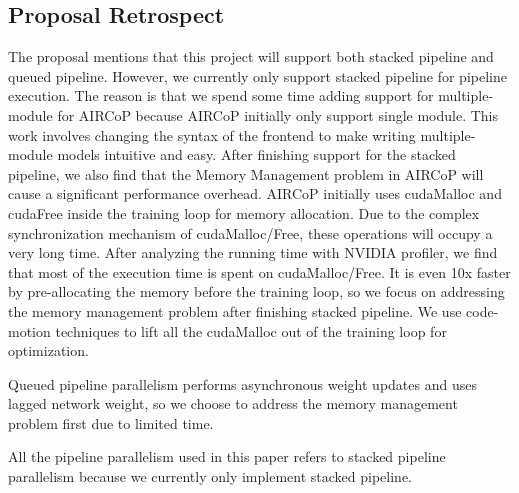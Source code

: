 \documentclass[sigplan, nonacm]{acmart}\settopmatter{printfolios=true,printccs=false,printacmref=false}
\begin{document}
\subsection{Proposal Retrospect}
The proposal mentions that this project will support both stacked pipeline and queued pipeline. However, we currently only support stacked pipeline for pipeline execution. The reason is that we spend some time adding support for multiple-module for AIRCoP because AIRCoP initially only support single module. This work involves changing the syntax of the frontend to make writing multiple-module models intuitive and easy. After finishing support for the stacked pipeline, we also find that the Memory Management problem in AIRCoP will cause a significant performance overhead. AIRCoP initially uses cudaMalloc and cudaFree inside the training loop for memory allocation. Due to the complex synchronization mechanism of cudaMalloc/Free, these operations will occupy a very long time. After analyzing the running time with NVIDIA profiler, we find that most of the execution time is spent on cudaMalloc/Free. It is even 10x faster by pre-allocating the memory before the training loop, so we focus on addressing the memory management problem after finishing stacked pipeline. We use code-motion techniques to lift all the cudaMalloc out of the training loop for optimization.\par
 Queued pipeline parallelism performs asynchronous weight updates and uses lagged network weight, so we choose to address the memory management problem first due to limited time.\par
All the pipeline parallelism used in this paper refers to stacked pipeline parallelism because we currently only implement stacked pipeline.
\end{document}
